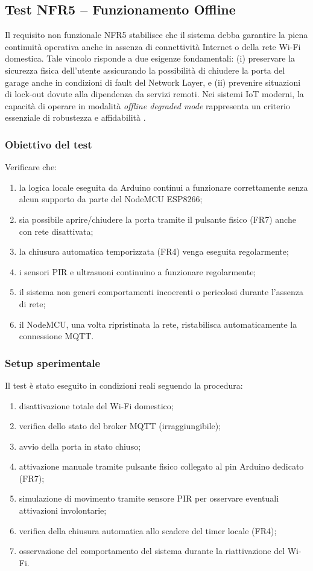 \subsection{Test NFR5 – Funzionamento Offline}

Il requisito non funzionale NFR5 stabilisce che il sistema debba garantire la piena continuità operativa anche in assenza di connettività Internet o della rete Wi-Fi domestica. Tale vincolo risponde a due esigenze fondamentali: (i) preservare la sicurezza fisica dell’utente assicurando la possibilità di chiudere la porta del garage anche in condizioni di fault del Network Layer, e (ii) prevenire situazioni di lock-out dovute alla dipendenza da servizi remoti. Nei sistemi IoT moderni, la capacità di operare in modalità \textit{offline degraded mode} rappresenta un criterio essenziale di robustezza e affidabilità \cite{Avizienis2004, Marwedel2021}.

\subsubsection*{Obiettivo del test}
Verificare che:
\begin{enumerate}
    \item la logica locale eseguita da Arduino continui a funzionare correttamente senza alcun supporto da parte del NodeMCU ESP8266;
    \item sia possibile aprire/chiudere la porta tramite il pulsante fisico (FR7) anche con rete disattivata;
    \item la chiusura automatica temporizzata (FR4) venga eseguita regolarmente;
    \item i sensori PIR e ultrasuoni continuino a funzionare regolarmente;
    \item il sistema non generi comportamenti incoerenti o pericolosi durante l’assenza di rete;
    \item il NodeMCU, una volta ripristinata la rete, ristabilisca automaticamente la connessione MQTT.
\end{enumerate}

\subsubsection*{Setup sperimentale}
Il test è stato eseguito in condizioni reali seguendo la procedura:
\begin{enumerate}
    \item disattivazione totale del Wi-Fi domestico;
    \item verifica dello stato del broker MQTT (irraggiungibile);
    \item avvio della porta in stato chiuso;
    \item attivazione manuale tramite pulsante fisico collegato al pin Arduino dedicato (FR7);
    \item simulazione di movimento tramite sensore PIR per osservare eventuali attivazioni involontarie;
    \item verifica della chiusura automatica allo scadere del timer locale (FR4);
    \item osservazione del comportamento del sistema durante la riattivazione del Wi-Fi.
\end{enumerate}

